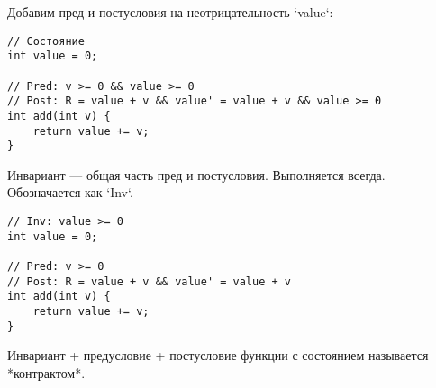 Добавим пред и постусловия на неотрицательность `value`:
\begin{verbatim}
// Состояние
int value = 0;

// Pred: v >= 0 && value >= 0
// Post: R = value + v && value' = value + v && value >= 0
int add(int v) {
    return value += v;
}
\end{verbatim}  

Инвариант --- общая часть пред и постусловия. Выполняется всегда. Обозначается как `Inv`.
\begin{verbatim}
// Inv: value >= 0
int value = 0;

// Pred: v >= 0
// Post: R = value + v && value' = value + v
int add(int v) {
    return value += v;
}
\end{verbatim}  

Инвариант + предусловие + постусловие функции с состоянием называется *контрактом*.